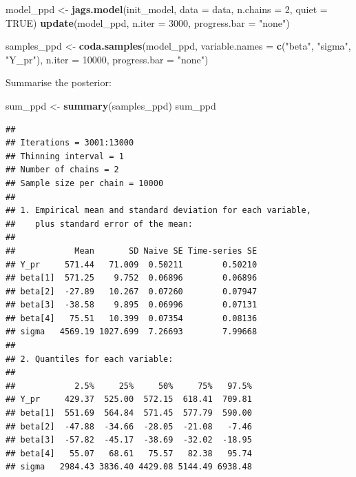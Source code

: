 \documentclass[
]{homework}
\newenvironment{Shaded}{\begin{snugshade}}{\end{snugshade}}
\newcommand{\AttributeTok}[1]{\textcolor[rgb]{0.13,0.29,0.53}{#1}}
\newcommand{\ConstantTok}[1]{\textcolor[rgb]{0.56,0.35,0.01}{#1}}
\newcommand{\DecValTok}[1]{\textcolor[rgb]{0.00,0.00,0.81}{#1}}
\newcommand{\FunctionTok}[1]{\textcolor[rgb]{0.13,0.29,0.53}{\textbf{#1}}}
\newcommand{\NormalTok}[1]{#1}
\newcommand{\OtherTok}[1]{\textcolor[rgb]{0.56,0.35,0.01}{#1}}
\newcommand{\StringTok}[1]{\textcolor[rgb]{0.31,0.60,0.02}{#1}}
\begin{document}
\begin{Shaded}
\begin{Highlighting}[]
\NormalTok{model\_ppd }\OtherTok{\textless{}{-}} \FunctionTok{jags.model}\NormalTok{(init\_model, }\AttributeTok{data =}\NormalTok{ data, }\AttributeTok{n.chains =} \DecValTok{2}\NormalTok{, }\AttributeTok{quiet =} \ConstantTok{TRUE}\NormalTok{)}
\FunctionTok{update}\NormalTok{(model\_ppd, }\AttributeTok{n.iter =} \DecValTok{3000}\NormalTok{, }\AttributeTok{progress.bar =} \StringTok{"none"}\NormalTok{)}

\NormalTok{samples\_ppd }\OtherTok{\textless{}{-}} \FunctionTok{coda.samples}\NormalTok{(model\_ppd, }\AttributeTok{variable.names =} \FunctionTok{c}\NormalTok{(}\StringTok{"beta"}\NormalTok{, }\StringTok{"sigma"}\NormalTok{, }\StringTok{"Y\_pr"}\NormalTok{), }
                            \AttributeTok{n.iter =} \DecValTok{10000}\NormalTok{, }\AttributeTok{progress.bar =} \StringTok{"none"}\NormalTok{)}
\end{Highlighting}
\end{Shaded}

Summarise the posterior:

\begin{Shaded}
\begin{Highlighting}[]
\NormalTok{sum\_ppd }\OtherTok{\textless{}{-}} \FunctionTok{summary}\NormalTok{(samples\_ppd)}
\NormalTok{sum\_ppd}
\end{Highlighting}
\end{Shaded}

\begin{verbatim}
## 
## Iterations = 3001:13000
## Thinning interval = 1 
## Number of chains = 2 
## Sample size per chain = 10000 
## 
## 1. Empirical mean and standard deviation for each variable,
##    plus standard error of the mean:
## 
##            Mean       SD Naive SE Time-series SE
## Y_pr     571.44   71.009  0.50211        0.50210
## beta[1]  571.25    9.752  0.06896        0.06896
## beta[2]  -27.89   10.267  0.07260        0.07947
## beta[3]  -38.58    9.895  0.06996        0.07131
## beta[4]   75.51   10.399  0.07354        0.08136
## sigma   4569.19 1027.699  7.26693        7.99668
## 
## 2. Quantiles for each variable:
## 
##            2.5%     25%     50%     75%   97.5%
## Y_pr     429.37  525.00  572.15  618.41  709.81
## beta[1]  551.69  564.84  571.45  577.79  590.00
## beta[2]  -47.88  -34.66  -28.05  -21.08   -7.46
## beta[3]  -57.82  -45.17  -38.69  -32.02  -18.95
## beta[4]   55.07   68.61   75.57   82.38   95.74
## sigma   2984.43 3836.40 4429.08 5144.49 6938.48
\end{verbatim}
\end{document}
